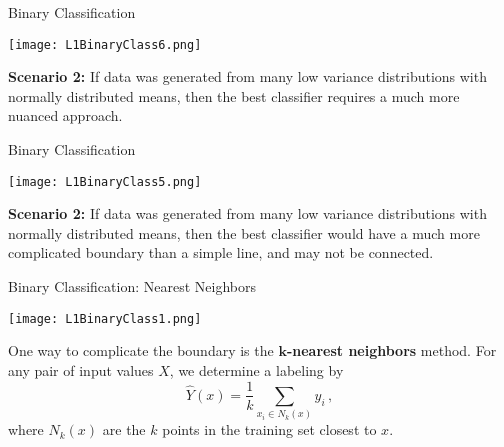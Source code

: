 \documentclass[10pt, handout]{beamer}
\begin{document}
\begin{frame}[fragile]{Binary Classification}
  \begin{minipage}[t][0.5\textheight][t]{\textwidth}
    \centering
     \texttt{[image: L1BinaryClass6.png]}
  \end{minipage}
  \vfill
  \begin{minipage}[t][0.5\textheight][t]{\textwidth}


\textbf{Scenario 2:} If data was generated from many low variance distributions with normally distributed means, then the best classifier requires a much more nuanced approach.

 \end{minipage}
\end{frame}




\begin{frame}[fragile]{Binary Classification}
  \begin{minipage}[t][0.5\textheight][t]{\textwidth}
    \centering
     \texttt{[image: L1BinaryClass5.png]}
  \end{minipage}
  \vfill
  \begin{minipage}[t][0.5\textheight][t]{\textwidth}


\textbf{Scenario 2:} If data was generated from many low variance distributions with normally distributed means, then the best classifier would have a much more complicated boundary than a simple line, and may not be connected. 

 \end{minipage}
\end{frame}






\begin{frame}[fragile]{Binary Classification: Nearest Neighbors}
  \begin{minipage}[t][0.5\textheight][t]{\textwidth}
    \centering
     \texttt{[image: L1BinaryClass1.png]}
  \end{minipage}
  \vfill
  \begin{minipage}[t][0.5\textheight][t]{\textwidth}

One way to complicate the boundary is the \textbf{$\mathbf k$-nearest neighbors} method. For any pair of input values $X$, we determine a labeling by
$$
\hat Y(x) = \frac{1}{k}\sum_{x_i\in N_k(x)}y_i \,,
$$
where $N_k(x)$ are the $k$ points in the training set closest to $x$. 


 \end{minipage}
\end{frame}
\end{document}
